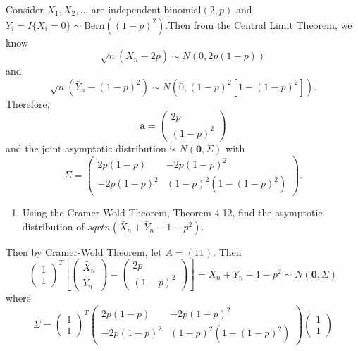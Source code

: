 \documentclass[12pt,]{article}
\providecommand{\tightlist}{%
  \setlength{\itemsep}{0pt}\setlength{\parskip}{0pt}}
\begin{document}
Consider \(X_1, X_2,...\) are independent binomial\((2,p)\) and
\(Y_i=I\{X_i=0\}\sim \text{Bern}\left((1-p)^2\right).\)Then from the
Central Limit Theorem, we know
\[\sqrt{n} (\bar X_n -2p)\sim N(0, 2p(1-p))\] and
\[\sqrt{n}(\bar Y_n-(1-p)^2)\sim N\left(0, (1-p)^2[1-(1-p)^2]\right).\]
Therefore,
\[\boldsymbol a = \begin{pmatrix} 2p \\ (1-p)^2\end{pmatrix}\] and the
joint asymptotic distribution is \(N\left(\boldsymbol 0, \Sigma\right)\)
with
\[\Sigma = \begin{pmatrix} 2p(1-p) & -2p(1-p)^2\\ -2p(1-p)^2 & (1-p)^2(1-(1-p)^2)\end{pmatrix}.\]

\begin{enumerate}
\def\labelenumi{(\alph{enumi})}
\setcounter{enumi}{1}
\tightlist
\item
  Using the Cramer-Wold Theorem, Theorem 4.12, find the asymptotic
  distribution of \(sqrt{n}(\bar X_n + \bar Y_n - 1 - p^2).\)
\end{enumerate}

Then by Cramer-Wold Theorem, let \(A = (1 1).\) Then
\[\begin{pmatrix} 1\\ 1 \end{pmatrix}^T\left[ \begin{pmatrix} \bar X_n \\ \bar Y_n \end{pmatrix} -\begin{pmatrix} 2p \\ (1-p)^2 \end{pmatrix}\right] = \bar X_n + \bar Y_n - 1 - p^2 \sim N\left(\boldsymbol 0, \Sigma\right)\]
where
\[\Sigma = \begin{pmatrix} 1\\ 1 \end{pmatrix}^T \begin{pmatrix} 2p(1-p) & -2p(1-p)^2\\ -2p(1-p)^2 & (1-p)^2(1-(1-p)^2)\end{pmatrix} \begin{pmatrix} 1\\ 1 \end{pmatrix}\]
\end{document}
